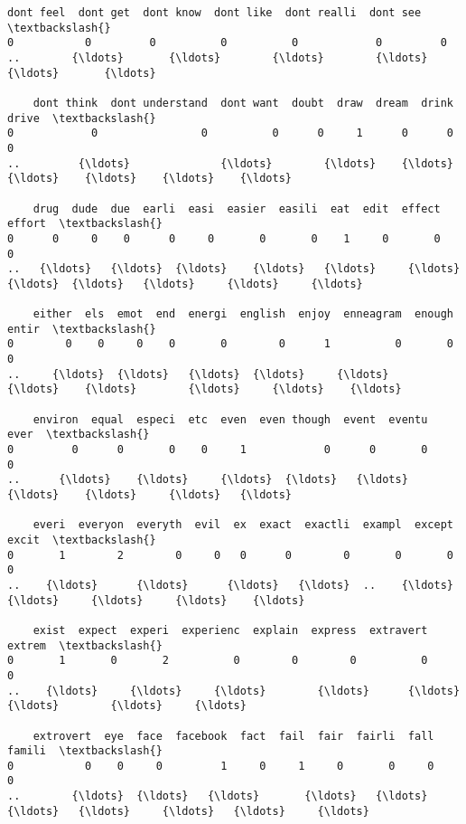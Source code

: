 \documentclass[11pt]{article}
\begin{document}
\begin{Verbatim}[commandchars=\\\{\}]
    dont feel  dont get  dont know  dont like  dont realli  dont see  \textbackslash{}
0           0         0          0          0            0         0   
..        {\ldots}       {\ldots}        {\ldots}        {\ldots}          {\ldots}       {\ldots}   

    dont think  dont understand  dont want  doubt  draw  dream  drink  drive  \textbackslash{}
0            0                0          0      0     1      0      0      0   
..         {\ldots}              {\ldots}        {\ldots}    {\ldots}   {\ldots}    {\ldots}    {\ldots}    {\ldots}   

    drug  dude  due  earli  easi  easier  easili  eat  edit  effect  effort  \textbackslash{}
0      0     0    0      0     0       0       0    1     0       0       0   
..   {\ldots}   {\ldots}  {\ldots}    {\ldots}   {\ldots}     {\ldots}     {\ldots}  {\ldots}   {\ldots}     {\ldots}     {\ldots}   

    either  els  emot  end  energi  english  enjoy  enneagram  enough  entir  \textbackslash{}
0        0    0     0    0       0        0      1          0       0      0   
..     {\ldots}  {\ldots}   {\ldots}  {\ldots}     {\ldots}      {\ldots}    {\ldots}        {\ldots}     {\ldots}    {\ldots}   

    environ  equal  especi  etc  even  even though  event  eventu  ever  \textbackslash{}
0         0      0       0    0     1            0      0       0     0   
..      {\ldots}    {\ldots}     {\ldots}  {\ldots}   {\ldots}          {\ldots}    {\ldots}     {\ldots}   {\ldots}   

    everi  everyon  everyth  evil  ex  exact  exactli  exampl  except  excit  \textbackslash{}
0       1        2        0     0   0      0        0       0       0      0   
..    {\ldots}      {\ldots}      {\ldots}   {\ldots}  ..    {\ldots}      {\ldots}     {\ldots}     {\ldots}    {\ldots}   

    exist  expect  experi  experienc  explain  express  extravert  extrem  \textbackslash{}
0       1       0       2          0        0        0          0       0   
..    {\ldots}     {\ldots}     {\ldots}        {\ldots}      {\ldots}      {\ldots}        {\ldots}     {\ldots}   

    extrovert  eye  face  facebook  fact  fail  fair  fairli  fall  famili  \textbackslash{}
0           0    0     0         1     0     1     0       0     0       0   
..        {\ldots}  {\ldots}   {\ldots}       {\ldots}   {\ldots}   {\ldots}   {\ldots}     {\ldots}   {\ldots}     {\ldots}   


\end{Verbatim}
\end{document}
